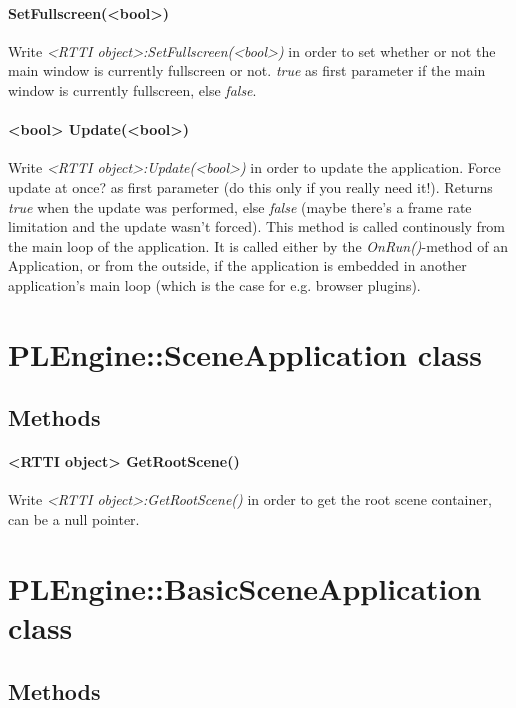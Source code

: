 \paragraph{SetFullscreen(<bool>)}
Write \emph{<RTTI object>:SetFullscreen(<bool>)} in order to set whether or not the main window is currently fullscreen or not. \emph{true} as first parameter if the main window is currently fullscreen, else \emph{false}.

\paragraph{<bool> Update(<bool>)}
Write \emph{<RTTI object>:Update(<bool>)} in order to update the application. Force update at once? as first parameter (do this only if you really need it!). Returns \emph{true} when the update was performed, else \emph{false} (maybe there's a frame rate limitation and the update wasn't forced). This method is called continously from the main loop of the application. It is called either by the \emph{OnRun()}-method of an Application, or from the outside, if the application is embedded in another application's main loop (which is the case for e.g. browser plugins).




\section{PLEngine::SceneApplication class}


\subsection{Methods}

\paragraph{<RTTI object> GetRootScene()}
Write \emph{<RTTI object>:GetRootScene()} in order to get the root scene container, can be a null pointer.




\section{PLEngine::BasicSceneApplication class}


\subsection{Methods}

